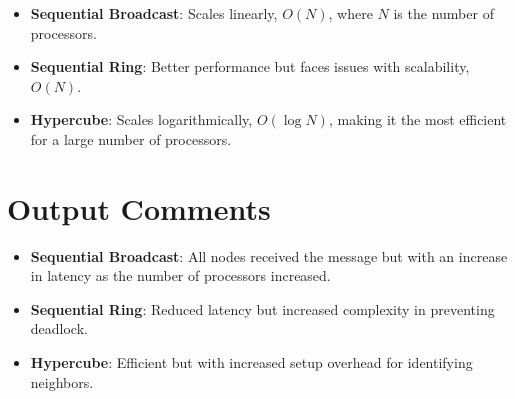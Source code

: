 \documentclass[11pt]{article}
\begin{document}
\begin{itemize}
    \item \textbf{Sequential Broadcast}: Scales linearly, $O(N)$, where $N$ is the number of processors.
    \item \textbf{Sequential Ring}: Better performance but faces issues with scalability, $O(N)$.
    \item \textbf{Hypercube}: Scales logarithmically, $O(\log N)$, making it the most efficient for a large number of processors.
\end{itemize}

\section{Output Comments}

\begin{itemize}
    \item \textbf{Sequential Broadcast}: All nodes received the message but with an increase in latency as the number of processors increased.
    \item \textbf{Sequential Ring}: Reduced latency but increased complexity in preventing deadlock.
    \item \textbf{Hypercube}: Efficient but with increased setup overhead for identifying neighbors.
\end{itemize}
\end{document}
